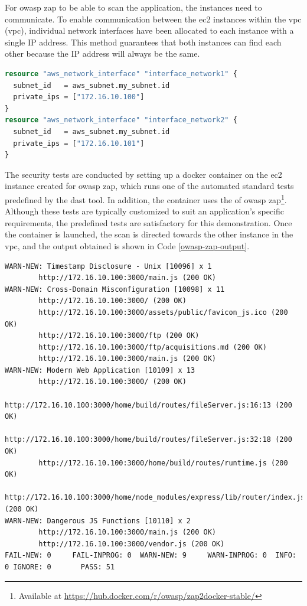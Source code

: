 For \acrshort{owasp} \acrshort{zap} to be able to scan the application, the instances need to communicate. To enable communication between the \acrshort{ec2} instances within the \acrlong{vpc} (\acrshort{vpc}), individual network interfaces have been allocated to each instance with a single IP address. This method guarantees that both instances can find each other because the IP address will always be the same.

\vspace{2mm}
\begin{lstlisting}[language=terraform, caption=Allocation of IP adresses, captionpos=b, frame=single]
resource "aws_network_interface" "interface_network1" {
  subnet_id   = aws_subnet.my_subnet.id
  private_ips = ["172.16.10.100"]
}
resource "aws_network_interface" "interface_network2" {
  subnet_id   = aws_subnet.my_subnet.id
  private_ips = ["172.16.10.101"] 
}
\end{lstlisting}

The security tests are conducted by setting up a docker container on the \acrshort{ec2} instance created for \acrshort{owasp} \acrshort{zap}, which runs one of the automated standard tests predefined by the \acrshort{dast} tool. In addition, the container uses the  of \acrshort{owasp} \acrshort{zap}\footnote{Available at \url{https://hub.docker.com/r/owasp/zap2docker-stable/}}. Although these tests are typically customized to suit an application's specific requirements, the predefined tests are satisfactory for this demonstration. Once the container is launched, the scan is directed towards the other instance in the \acrshort{vpc}, and the output obtained is shown in Code \ref{owasp-zap-output}.

\vspace{2mm}
\begin{lstlisting}[caption=The output of an OWASP ZAP baseline scan, captionpos=b, frame=single, label={owasp-zap-output}]
WARN-NEW: Timestamp Disclosure - Unix [10096] x 1
        http://172.16.10.100:3000/main.js (200 OK)
WARN-NEW: Cross-Domain Misconfiguration [10098] x 11
        http://172.16.10.100:3000/ (200 OK)
        http://172.16.10.100:3000/assets/public/favicon_js.ico (200 OK)
        http://172.16.10.100:3000/ftp (200 OK)
        http://172.16.10.100:3000/ftp/acquisitions.md (200 OK)
        http://172.16.10.100:3000/main.js (200 OK)
WARN-NEW: Modern Web Application [10109] x 13
        http://172.16.10.100:3000/ (200 OK)
        http://172.16.10.100:3000/home/build/routes/fileServer.js:16:13 (200 OK)
        http://172.16.10.100:3000/home/build/routes/fileServer.js:32:18 (200 OK)
        http://172.16.10.100:3000/home/build/routes/runtime.js (200 OK)
        http://172.16.10.100:3000/home/node_modules/express/lib/router/index.js:280:10 (200 OK)
WARN-NEW: Dangerous JS Functions [10110] x 2
        http://172.16.10.100:3000/main.js (200 OK)
        http://172.16.10.100:3000/vendor.js (200 OK)
FAIL-NEW: 0     FAIL-INPROG: 0  WARN-NEW: 9     WARN-INPROG: 0  INFO: 0 IGNORE: 0       PASS: 51
\end{lstlisting}


